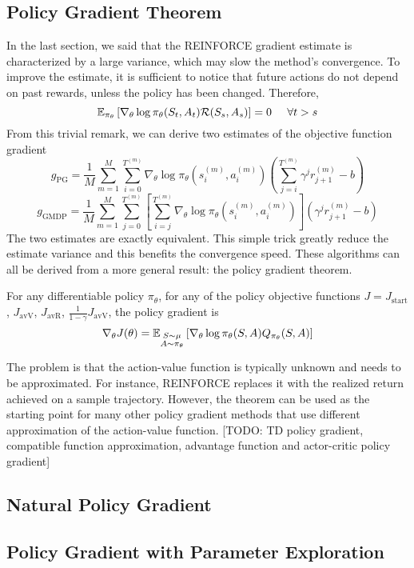 \subsection{Policy Gradient Theorem}
In the last section, we said that the REINFORCE gradient estimate is
characterized by a large variance, which may slow the method's convergence. 
To improve the estimate, it is sufficient to notice that future actions do not
depend on past rewards, unless the policy has been changed. Therefore, 
\begin{equation}
	\E[\pi_\theta]{\nabla_\theta\log \pi_\theta(S_t, A_t) \calR(S_s, A_s)} = 0
	\;\;\;\;\; \forall t>s
\end{equation}
From this trivial remark, we can derive two estimates of the objective function
gradient
\begin{equation}
	g_{\text{PG}} = \frac{1}{M} \sum^{M}_{m=1} \sum_{i=0}^{T^{(m)}} 
	\nabla_\theta \log \pi_\theta(s_i^{(m)}, a_i^{(m)}) \left( 
	\sum^{T^{(m)}}_{j=i} \gamma^j r_{j+1}^{(m)} - b \right)
\end{equation}
\begin{equation}
	g_{\text{GMDP}} = \frac{1}{M} \sum^{M}_{m=1} \sum_{j=0}^{T^{(m)}} \left[ 
	\sum_{i=j}^{T^{(m)}} \nabla_\theta \log \pi_\theta(s_i^{(m)}, a_i^{(m)})
	\right] \left(\gamma^j r_{j+1}^{(m)} - b \right)  
\end{equation}
The two estimates are exactly equivalent. This simple trick greatly reduce the
estimate variance and this benefits the convergence speed. These algorithms can 
all be derived from a more general result: the policy gradient theorem. 
\begin{theorem}
	For any differentiable policy $\pi_\theta$, for any of the policy objective
	functions $J = J_{\text{start}}$, $J_{\text{avV}}$, $J_{\text{avR}}$,
	$\frac{1}{1-\gamma} J_{\text{avV}}$, the policy gradient is 
	\begin{equation}
		\nabla_\theta J(\theta) =
		\E[\substack{S \sim \mu\\A \sim \pi_\theta}]{\nabla_\theta\log\pi_\theta(S,A) Q_{\pi_\theta}(S, A)}
	\end{equation}
\end{theorem}
The problem is that the action-value function is typically unknown and needs to
be approximated. For instance, REINFORCE replaces it with the realized return 
achieved on a sample trajectory. However, the theorem can be used as the 
starting point for many other policy gradient methods that use different 
approximation of the action-value function. [TODO: TD policy gradient,
compatible function approximation, advantage function and actor-critic policy
gradient]

\subsection{Natural Policy Gradient}

\subsection{Policy Gradient with Parameter Exploration}
